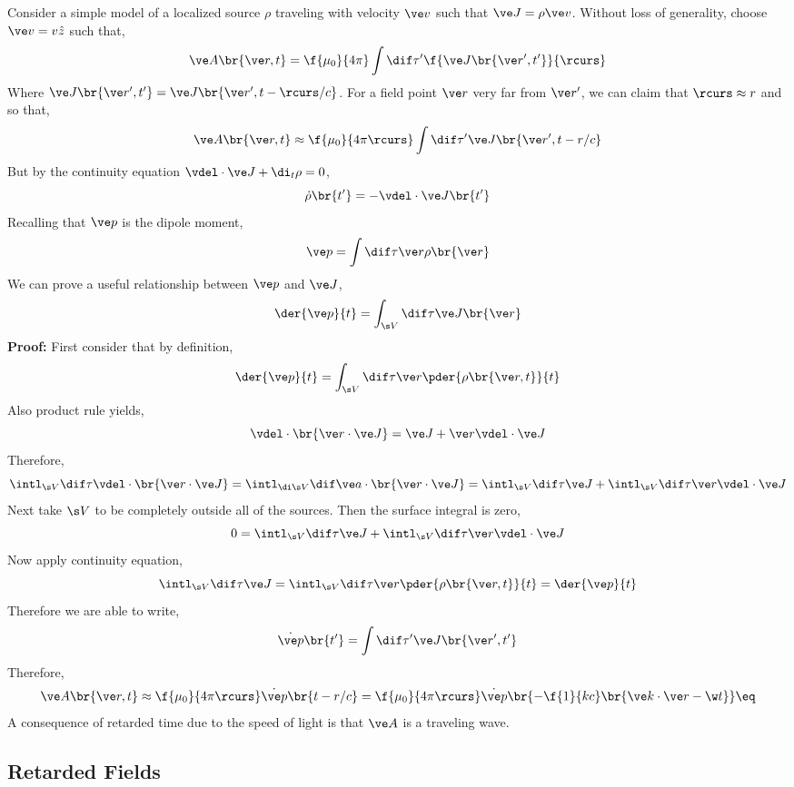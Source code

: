 \documentclass{article}
\begin{document}
Consider a simple model of a localized source $\rho$ traveling with velocity $\ve v$ such that $\ve J = \rho \ve v$. Without loss of generality, choose $\ve v = v \hat z$ such that,
\[ \ve A \br{\ve r, t} = \f{\mu_0}{4 \pi} \int \dif \tau' \f{\ve J\br{\ve r', t'}}{\rcurs} \]
Where $\ve J\br{\ve r', t'} = \ve J\br{\ve r', t - \rcurs / c}$. For a field point $\ve r$ very far from $\ve r'$, we can claim that $\rcurs \approx r$ and so that,
\[ \ve A \br{\ve r, t} \approx \f{\mu_0}{4 \pi \rcurs} \int \dif \tau' \ve J\br{\ve r', t - r / c} \]
But by the continuity equation $\vdel \cdot \ve J + \di_t \rho = 0$,
\[ \dot \rho \br{t'} = - \vdel \cdot \ve J\br{t'} \]
Recalling that $\ve p$ is the dipole moment,
\[ \ve p = \int \dif \tau \ve r \rho\br{\ve r} \]
We can prove a useful relationship between $\ve p$ and $\ve J$,
\[ \der{\ve p}{t} = \int_{\s V} \dif \tau \ve J\br{\ve r} \]
\textbf{Proof:}
First consider that by definition,
\[ \der{\ve p}{t} = \int_{\s V} \dif \tau \ve r \pder{\rho\br{\ve r, t}}{t} \]
Also product rule yields,
\[ \vdel \cdot \br{\ve r \cdot \ve J} = \ve J + \ve r \vdel \cdot \ve J \]
Therefore,
\[ \intl_{\s V} \dif \tau \vdel \cdot \br{\ve r \cdot \ve J} = \intl_{\di \s V} \dif \ve a \cdot \br{\ve r \cdot \ve J} = \intl_{\s V} \dif \tau \ve J + \intl_{\s V} \dif \tau \ve r \vdel \cdot \ve J \]
Next take $\s V$ to be completely outside all of the sources. Then the surface integral is zero,
\[ 0 = \intl_{\s V} \dif \tau \ve J + \intl_{\s V} \dif \tau \ve r \vdel \cdot \ve J \]
Now apply continuity equation,
\[ \intl_{\s V} \dif \tau \ve J = \intl_{\s V} \dif \tau \ve r \pder{\rho\br{\ve r, t}}{t} = \der{\ve p}{t} \]
Therefore we are able to write,
\[ \dot {\ve p}\br{t'} = \int \dif \tau' \ve J\br{\ve r', t'} \]
Therefore,
\[ \ve A \br{\ve r, t} \approx \f{\mu_0}{4 \pi \rcurs} \dot {\ve p} \br{t - r /c} = \f{\mu_0}{4 \pi \rcurs} \dot {\ve p} \br{-\f{1}{kc}\br{\ve k \cdot \ve r - \w t}} \eq \label{eq:simple_model} \]
A consequence of retarded time due to the speed of light is that $\ve A$ is a traveling wave.

\subsection{Retarded Fields}
\end{document}
